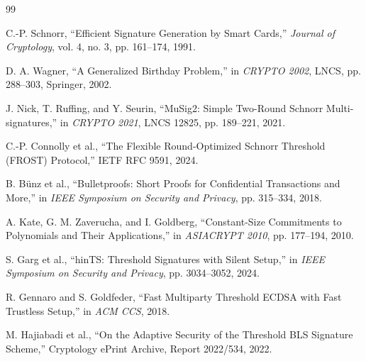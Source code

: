 \documentclass[10pt,a4paper]{article}
\begin{document}
\begin{thebibliography}{99}

C.-P. Schnorr, ``Efficient Signature Generation by Smart Cards,''
\emph{Journal of Cryptology}, vol. 4, no. 3, pp. 161--174, 1991.

D. A. Wagner, ``A Generalized Birthday Problem,''
in \emph{CRYPTO 2002}, LNCS, pp. 288--303, Springer, 2002.

J. Nick, T. Ruffing, and Y. Seurin,
``MuSig2: Simple Two-Round Schnorr Multi-signatures,''
in \emph{CRYPTO 2021}, LNCS 12825, pp. 189--221, 2021.

C.-P. Connolly et al.,
``The Flexible Round-Optimized Schnorr Threshold (FROST) Protocol,''
IETF RFC 9591, 2024.

B. B{\"u}nz et al.,
``Bulletproofs: Short Proofs for Confidential Transactions and More,''
in \emph{IEEE Symposium on Security and Privacy}, pp. 315--334, 2018.

A. Kate, G. M. Zaverucha, and I. Goldberg,
``Constant-Size Commitments to Polynomials and Their Applications,''
in \emph{ASIACRYPT 2010}, pp. 177--194, 2010.

S. Garg et al.,
``hinTS: Threshold Signatures with Silent Setup,''
in \emph{IEEE Symposium on Security and Privacy},
pp. 3034--3052, 2024.

R. Gennaro and S. Goldfeder,
``Fast Multiparty Threshold ECDSA with Fast Trustless Setup,''
in \emph{ACM CCS}, 2018.

M. Hajiabadi et al.,
``On the Adaptive Security of the Threshold BLS Signature Scheme,''
Cryptology ePrint Archive, Report 2022/534, 2022.

\end{thebibliography}
\end{document}
